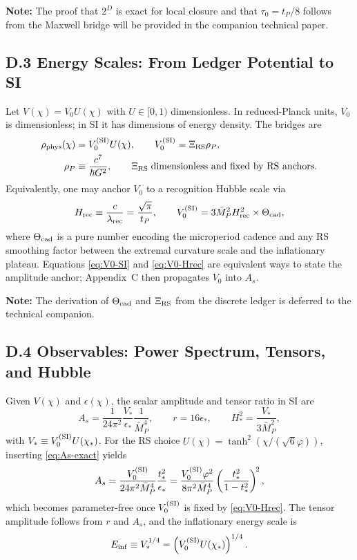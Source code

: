 \documentclass[11pt]{article}
\theoremstyle{definition}
\theoremstyle{remark}
\begin{document}
\medskip
\noindent\textbf{Note:} The proof that \(2^D\) is exact for local closure and that \(\tau_0=t_P/8\) follows from the Maxwell bridge will be provided in the companion technical paper.

\subsection*{D.3 Energy Scales: From Ledger Potential to SI}
Let $V(\chi)=V_0 U(\chi)$ with $U\in[0,1)$ dimensionless. In reduced-Planck units, $V_0$ is dimensionless; in SI it has dimensions of energy density. The bridges are
\begin{align}
\rho_{\rm phys}(\chi) &= V_0^{\rm (SI)}U(\chi), \qquad
V_0^{\rm (SI)} = \Xi_{\rm RS}\rho_P, \label{eq:V0-SI}\\
\rho_P &\equiv \frac{c^7}{\hbar G^2}, \qquad
\Xi_{\rm RS}\;\text{dimensionless and fixed by RS anchors.} \nonumber
\end{align}
Equivalently, one may anchor $V_0$ to a recognition Hubble scale via
\begin{equation}
H_{\rm rec}\equiv \frac{c}{\lambda_{\rm rec}}=\frac{\sqrt{\pi}}{t_P},\qquad
V_0^{\rm (SI)} = 3\bar{M}_P^2 H_{\rm rec}^2 \times \Theta_{\rm cad},
\label{eq:V0-Hrec}
\end{equation}
where $\Theta_{\rm cad}$ is a pure number encoding the microperiod cadence and any RS smoothing factor between the extremal curvature scale and the inflationary plateau. Equations \eqref{eq:V0-SI} and \eqref{eq:V0-Hrec} are equivalent ways to state the amplitude anchor; Appendix~C then propagates $V_0$ into $A_s$.

\medskip
\noindent\textbf{Note:} The derivation of \(\Theta_{\rm cad}\) and \(\Xi_{\rm RS}\) from the discrete ledger is deferred to the technical companion.

\subsection*{D.4 Observables: Power Spectrum, Tensors, and Hubble}
Given $V(\chi)$ and $\epsilon(\chi)$, the scalar amplitude and tensor ratio in SI are
\begin{equation}
A_s = \frac{1}{24\pi^2}\frac{V_*}{\epsilon_*}\frac{1}{\bar{M}_P^4},\qquad
r=16\epsilon_*,\qquad
H_*^2=\frac{V_*}{3\bar{M}_P^2}, \label{eq:obs-SI}
\end{equation}
with $V_*\equiv V_0^{\rm (SI)} U(\chi_*)$. For the RS choice $U(\chi)=\tanh^2(\chi/(\sqrt{6}\varphi))$, inserting \eqref{eq:As-exact} yields
\begin{equation}
A_s = \frac{V_0^{\rm (SI)}}{24\pi^2\bar{M}_P^4}
\frac{t_*^2}{\epsilon_*}
=\frac{V_0^{\rm (SI)}\varphi^2}{8\pi^2\bar{M}_P^4}
\left(\frac{t_*^2}{1-t_*^2}\right)^{\!2},
\label{eq:As-SI}
\end{equation}
which becomes parameter-free once $V_0^{\rm (SI)}$ is fixed by \eqref{eq:V0-Hrec}. The tensor amplitude follows from $r$ and $A_s$, and the inflationary energy scale is
\begin{equation}
E_{\rm inf} \equiv V_*^{1/4}=\left(V_0^{\rm (SI)}U(\chi_*)\right)^{1/4}.
\label{eq:Einf}
\end{equation}
\end{document}
